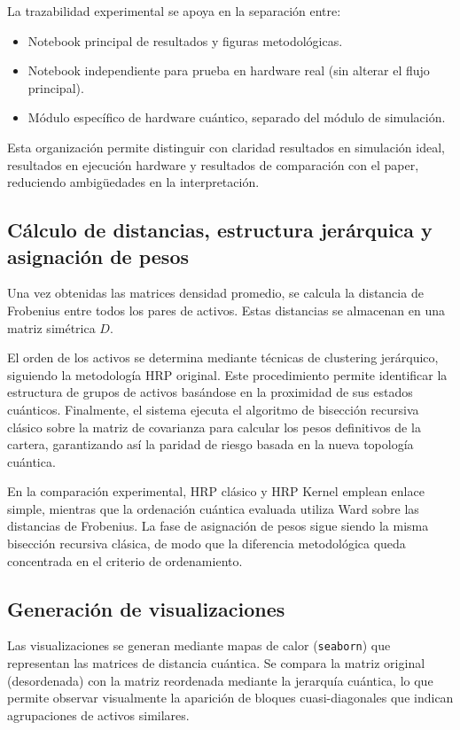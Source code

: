 La trazabilidad experimental se apoya en la separación entre:
\begin{itemize}
\item Notebook principal de resultados y figuras metodológicas.
\item Notebook independiente para prueba en hardware real (sin alterar el flujo principal).
\item Módulo específico de hardware cuántico, separado del módulo de simulación.
\end{itemize}

Esta organización permite distinguir con claridad resultados en simulación ideal, resultados en ejecución hardware y resultados de comparación con el paper, reduciendo ambigüedades en la interpretación.

\subsection{Cálculo de distancias, estructura jerárquica y asignación de pesos}
\label{sec:calculo_distancias_estructura}

Una vez obtenidas las matrices densidad promedio, se calcula la distancia de Frobenius entre todos los pares de activos. Estas distancias se almacenan en una matriz simétrica $D$.

El orden de los activos se determina mediante técnicas de clustering jerárquico, siguiendo la metodología HRP original. Este procedimiento permite identificar la estructura de grupos de activos basándose en la proximidad de sus estados cuánticos. Finalmente, el sistema ejecuta el algoritmo de bisección recursiva clásico sobre la matriz de covarianza para calcular los pesos definitivos de la cartera, garantizando así la paridad de riesgo basada en la nueva topología cuántica.

En la comparación experimental, HRP clásico y HRP Kernel emplean enlace simple, mientras que la ordenación cuántica evaluada utiliza Ward sobre las distancias de Frobenius. La fase de asignación de pesos sigue siendo la misma bisección recursiva clásica, de modo que la diferencia metodológica queda concentrada en el criterio de ordenamiento.

\subsection{Generación de visualizaciones}
\label{sec:generacion_visualizaciones}

Las visualizaciones se generan mediante mapas de calor (\texttt{seaborn}) que representan las matrices de distancia cuántica. Se compara la matriz original (desordenada) con la matriz reordenada mediante la jerarquía cuántica, lo que permite observar visualmente la aparición de bloques cuasi-diagonales que indican agrupaciones de activos similares.

